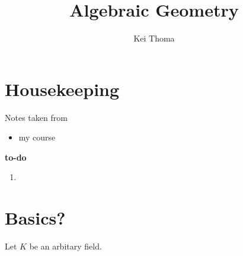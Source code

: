 \documentclass[a4paper]{book}
\title{Algebraic Geometry}
\author{Kei Thoma}
\theoremstyle{definition}
\begin{document}
\maketitle
\tableofcontents

\newpage
\chapter*{Housekeeping}
Notes taken from
\begin{itemize}
    \item my course
\end{itemize}

\textbf{to-do}
\begin{enumerate}
    \item
\end{enumerate}




\chapter{Basics?}

Let \(K\) be an arbitary field.
\end{document}
